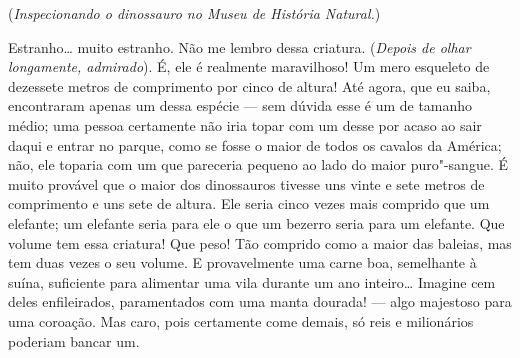 \noindent (\textit{Inspecionando o dinossauro no Museu de História Natural.})

Estranho\ldots{} muito estranho. Não me lembro dessa criatura. (\textit{Depois de olhar longamente, admirado}).
É, ele é realmente maravilhoso! Um mero esqueleto de dezessete metros de comprimento por
cinco de altura! Até agora, que eu saiba, encontraram apenas um dessa espécie --- sem
dúvida esse é um de tamanho médio; uma pessoa certamente não iria topar com um
desse por acaso ao sair daqui e entrar no parque, como se fosse o maior de todos
os cavalos da América; não, ele toparia com um que pareceria pequeno ao lado do
maior puro"-sangue. É muito provável que o maior dos dinossauros tivesse uns vinte e sete
metros de comprimento e uns sete de altura. Ele seria cinco vezes mais comprido que
um elefante; um elefante seria para ele o que um bezerro seria para um elefante.
Que volume tem essa criatura! Que peso! Tão comprido como a maior das baleias, mas
tem duas vezes o seu volume. E provavelmente uma carne boa, semelhante à suína, 
suficiente para alimentar uma vila durante um ano inteiro\ldots{} Imagine cem deles
enfileirados, paramentados com uma manta dourada! --- algo majestoso para uma coroação. 
Mas caro, pois certamente come demais, só reis e
milionários poderiam bancar um.

